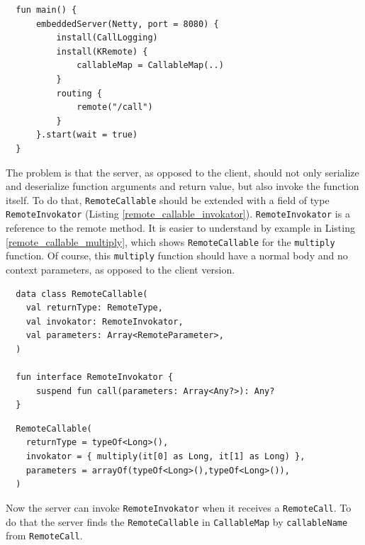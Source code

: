 \documentclass[a4paper,11pt,oneside]{article}
\newcommand{\kotlini}[1]{\texttt{#1}}
\begin{document}
\begin{listing}[!h]
  \begin{verbatim}
  fun main() {
      embeddedServer(Netty, port = 8080) {
          install(CallLogging)
          install(KRemote) {
              callableMap = CallableMap(..)
          }
          routing {
              remote("/call")
          }
      }.start(wait = true)
  }
  \end{verbatim}
  \caption{Kotlin Remote server}\label{remote_server}
\end{listing}

The problem is that the server, as opposed to the client, should not only serialize and deserialize function
arguments and return value, but also invoke the function itself. To do that, \kotlini{RemoteCallable}
should be extended with a field of type \kotlini{RemoteInvokator} (Listing
\ref{remote_callable_invokator}). \kotlini{RemoteInvokator} is a reference to the remote
method. It is easier to understand by example in Listing \ref{remote_callable_multiply}, which shows
\kotlini{RemoteCallable} for the \kotlini{multiply} function. Of course, this \kotlini{multiply} function should
have a normal body and no context parameters, as opposed to the client version.

\begin{listing}[!h]
  \begin{verbatim}
  data class RemoteCallable(
    val returnType: RemoteType,
    val invokator: RemoteInvokator,
    val parameters: Array<RemoteParameter>,
  )

  fun interface RemoteInvokator {
      suspend fun call(parameters: Array<Any?>): Any?
  }
  \end{verbatim}
  \caption{RemoteCallable with invocator}\label{remote_callable_invokator}
\end{listing}

\begin{listing}[!h]
  \begin{verbatim}
  RemoteCallable(
    returnType = typeOf<Long>(),
    invokator = { multiply(it[0] as Long, it[1] as Long) },
    parameters = arrayOf(typeOf<Long>(),typeOf<Long>()),
  )
  \end{verbatim}
  \caption{RemoteCallable for multiply}\label{remote_callable_multiply}
\end{listing}

Now the server can invoke \kotlini{RemoteInvokator} when it receives a \kotlini{RemoteCall}. To do that
the server finds the \kotlini{RemoteCallable} in \kotlini{CallableMap} by \kotlini{callableName} from
\kotlini{RemoteCall}.
\end{document}
